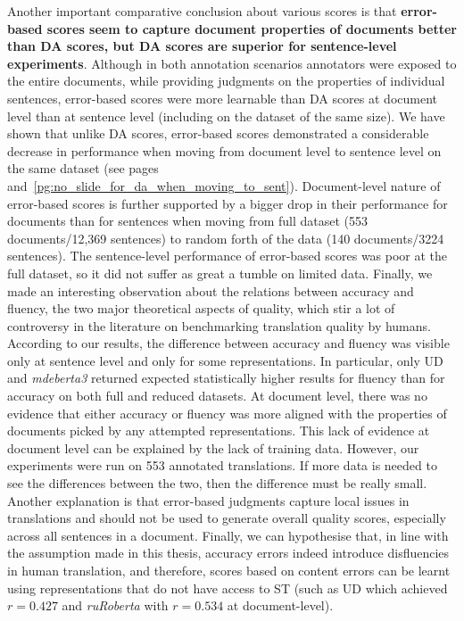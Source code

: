 Another important comparative conclusion about various scores is that \textbf{error-based scores seem to capture document properties of documents better than DA scores, but DA scores are superior for sentence-level experiments}. 
Although in both annotation scenarios annotators were exposed to the entire documents, while providing judgments on the properties of individual sentences, error-based scores were more learnable than DA scores at document level than at sentence level (including on the dataset of the same size). We have shown that unlike DA scores, error-based scores demonstrated a considerable decrease in performance when moving from document level to sentence level on the same dataset (see pages~\pageref{pg:downward_slide} and~\ref{pg:no_slide_for_da_when_moving_to_sent}). 
Document-level nature of error-based scores is further supported by a bigger drop in their performance for documents than for sentences when moving from full dataset (553 documents/12,369 sentences) to random forth of the data (140 documents/3224 sentences). The sentence-level performance of error-based scores was poor at the full dataset, so it did not suffer as great a tumble on limited data.
Finally, we made an interesting observation about the relations between accuracy and fluency, the two major theoretical aspects of quality, which stir a lot of controversy in the literature on benchmarking translation quality by humans.
According to our results, the difference between accuracy and fluency was visible only at sentence level and only for some representations. In particular, only UD and \textit{mdeberta3} returned expected statistically higher results for fluency than for accuracy on both full and reduced datasets. %
At document level, there was no evidence that either accuracy or fluency was more aligned with the properties of documents picked by any attempted representations. 
This lack of evidence at document level can be explained by the lack of training data. 
However, our experiments were run on 553 annotated translations. If more data is needed to see the differences between the two, then the difference must be really small. Another explanation is that error-based judgments capture local issues in translations and should not be used to generate overall quality scores, especially across all sentences in a document. Finally, we can hypothesise that, in line with the assumption made in this thesis, accuracy errors indeed introduce disfluencies in human translation, and therefore, scores based on content errors can be learnt using representations that do not have access to ST (such as UD which achieved $r=0.427$ and \textit{ruRoberta} with $r=0.534$ at document-level).
